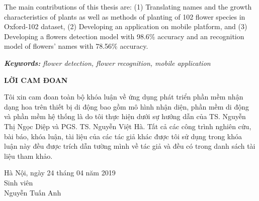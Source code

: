 \documentclass[12pt]{report}
\begin{document}
		The main contributions of this thesis are: (1) Translating names and the growth characteristics of plants as well as methods of planting of 102 flower species in Oxford-102 dataset, (2) Developing an application on mobile platform, and (3) Developing a flowers detection model with 98.6\% accuracy and an recognition model of flowers' names with 78.56\% accuracy.
																																																																										
																																																																										
		\noindent \textit{\textbf{Keywords:} flower detection, flower recognition, mobile application}
																																																																										
		\newpage
		\begin{center}
			\textbf{\large LỜI CAM ĐOAN}
		\end{center}
		Tôi xin cam đoan toàn bộ khóa luận về ứng dụng phát triển phần mềm nhận dạng hoa trên thiết bị di động bao gồm mô hình nhận diện, phần mềm di động và phần mềm hệ thống là do tôi thực hiện dưới sự hướng dẫn của TS. Nguyễn Thị Ngọc Diệp và PGS. TS. Nguyễn Việt Hà. Tất cả các công trình nghiên cứu, bài báo, khóa luận, tài liệu của các tác giả khác được tôi sử dụng trong khóa luận này đều được trích dẫn tường mình về tác giả và đều có trong danh sách tài liệu tham khảo.
																																																																										
		\begin{flushright}
			\begin{varwidth}{\linewidth}\centering
				Hà Nội, ngày 24 tháng 04 năm 2019\\
				Sinh viên\\[2cm]
				Nguyễn Tuấn Anh
			\end{varwidth}
		\end{flushright}
																																																																										
		\newpage
		\tableofcontents
																																																																										
		\newpage
		\listoftables
																																																																										
\end{document}

